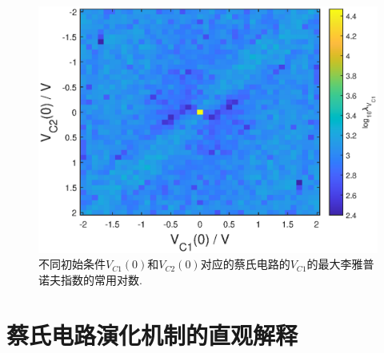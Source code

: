 \documentclass[a4paper, 10pt]{article}
\begin{document}
\begin{multicols*}{2}
\begin{figure}[H]
    \centering
    \includegraphics[width=\columnwidth]{LyapunovExponentMap.eps}
    \caption{不同初始条件$V_{C1}(0)$和$V_{C2}(0)$对应的蔡氏电路的$V_{C1}$的最大李雅普诺夫指数的常用对数.}
    \label{LyapunovExponentMap}
\end{figure}

\section{蔡氏电路演化机制的直观解释}


\end{multicols*}
\end{document}
